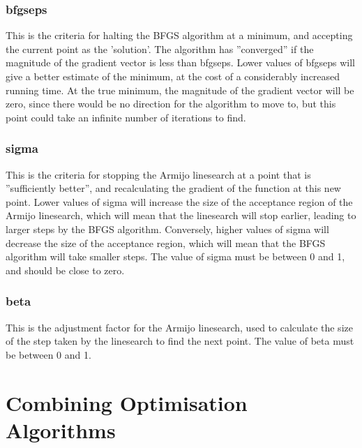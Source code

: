 \documentclass[10pt,twoside]{book}
\begin{document}
\subsubsection{bfgseps}
This is the criteria for halting the BFGS algorithm at a minimum, and accepting the current point as the 'solution'.  The algorithm has ''converged'' if the magnitude of the gradient vector is less than bfgseps.  Lower values of bfgseps will give a better estimate of the minimum, at the cost of a considerably increased running time.  At the true minimum, the magnitude of the gradient vector will be zero, since there would be no direction for the algorithm to move to, but this point could take an infinite number of iterations to find.

\subsubsection{sigma}
This is the criteria for stopping the Armijo linesearch at a point that is ''sufficiently better'', and recalculating the gradient of the function at this new point.  Lower values of sigma will increase the size of the acceptance region of the Armijo linesearch, which will mean that the linesearch will stop earlier, leading to larger steps by the BFGS algorithm.  Conversely, higher values of sigma will decrease the size of the acceptance region, which will mean that the BFGS algorithm will take smaller steps.  The value of sigma must be between 0 and 1, and should be close to zero.

\subsubsection{beta}
This is the adjustment factor for the Armijo linesearch, used to calculate the size of the step taken by the linesearch to find the next point.  The value of beta must be between 0 and 1.


\section{Combining Optimisation Algorithms}\label{sec:combine}
\end{document}
